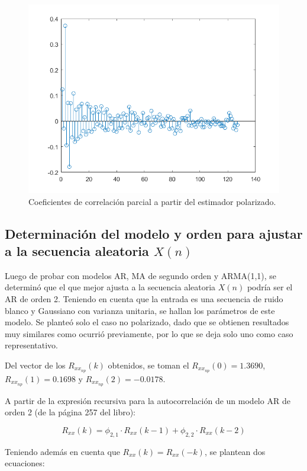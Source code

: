 \begin{figure}[H] %
\centering
\includegraphics[scale=0.45]{../EJ1/coefCorrParcialP}
\caption{Coeficientes de correlaci\'on parcial a partir del estimador polarizado.}
\label{fiP}
\end{figure}

\subsection{Determinaci\'on del modelo y orden para ajustar a la secuencia aleatoria $X(n)$}

Luego de probar con modelos AR, MA de segundo orden y ARMA(1,1), se determin\'o que el que mejor ajusta a la secuencia aleatoria $X(n)$ podr\'ia ser el AR de orden 2. Teniendo en cuenta que la entrada es una secuencia de ruido blanco y Gaussiano con varianza unitaria, se hallan los par\'ametros de este modelo. Se planteó solo el caso no polarizado, dado que se obtienen resultados muy similares como ocurrió previamente, por lo que se deja solo uno como caso representativo.\par
Del vector de los $R_{xx_{np}}(k)$ obtenidos, se toman el $R_{xx_{np}}(0) = 1.3690$, $R_{xx_{np}}(1) = 0.1698$ y $R_{xx_{np}}(2) = -0.0178$.\par A partir de la expresión recursiva para la autocorrelación de un modelo AR de orden 2 (de la página 257 del libro):

\[
R_{xx}(k) = \phi_{2,1} \cdot R_{xx}(k-1) + \phi_{2,2} \cdot R_{xx}(k-2)
\]

Teniendo además en cuenta que $R_{xx}(k) = R_{xx}(-k)$, se plantean dos ecuaciones:

